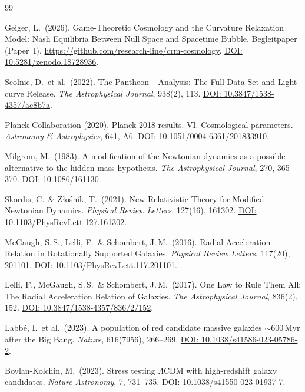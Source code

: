 \documentclass[aps,prd,twocolumn,superscriptaddress,nofootinbib]{revtex4-2}
\begin{document}
\begin{thebibliography}{99}

Geiger, L.\ (2026).
Game-Theoretic Cosmology and the Curvature Relaxation Model: Nash Equilibria Between Null Space and Spacetime Bubble.
Begleitpaper (Paper~I). \url{https://github.com/research-line/crm-cosmology}. \href{https://doi.org/10.5281/zenodo.18728936}{DOI: 10.5281/zenodo.18728936}.

Scolnic, D.\ et al.\ (2022).
The Pantheon+ Analysis: The Full Data Set and Light-curve Release.
\textit{The Astrophysical Journal}, 938(2), 113.
\href{https://doi.org/10.3847/1538-4357/ac8b7a}{DOI: 10.3847/1538-4357/ac8b7a}.

Planck Collaboration (2020).
Planck 2018 results. VI. Cosmological parameters.
\textit{Astronomy \& Astrophysics}, 641, A6.
\href{https://doi.org/10.1051/0004-6361/201833910}{DOI: 10.1051/0004-6361/201833910}.

Milgrom, M.\ (1983).
A modification of the Newtonian dynamics as a possible alternative to the hidden mass hypothesis.
\textit{The Astrophysical Journal}, 270, 365--370.
\href{https://doi.org/10.1086/161130}{DOI: 10.1086/161130}.

Skordis, C.\ \& Z{\l}o\'snik, T.\ (2021).
New Relativistic Theory for Modified Newtonian Dynamics.
\textit{Physical Review Letters}, 127(16), 161302.
\href{https://doi.org/10.1103/PhysRevLett.127.161302}{DOI: 10.1103/PhysRevLett.127.161302}.

McGaugh, S.\,S., Lelli, F.\ \& Schombert, J.\,M.\ (2016).
Radial Acceleration Relation in Rotationally Supported Galaxies.
\textit{Physical Review Letters}, 117(20), 201101.
\href{https://doi.org/10.1103/PhysRevLett.117.201101}{DOI: 10.1103/PhysRevLett.117.201101}.

Lelli, F., McGaugh, S.\,S.\ \& Schombert, J.\,M.\ (2017).
One Law to Rule Them All: The Radial Acceleration Relation of Galaxies.
\textit{The Astrophysical Journal}, 836(2), 152.
\href{https://doi.org/10.3847/1538-4357/836/2/152}{DOI: 10.3847/1538-4357/836/2/152}.

Labb\'e, I.\ et al.\ (2023).
A population of red candidate massive galaxies $\sim$600\,Myr after the Big Bang.
\textit{Nature}, 616(7956), 266--269.
\href{https://doi.org/10.1038/s41586-023-05786-2}{DOI: 10.1038/s41586-023-05786-2}.

Boylan-Kolchin, M.\ (2023).
Stress testing $\Lambda$CDM with high-redshift galaxy candidates.
\textit{Nature Astronomy}, 7, 731--735.
\href{https://doi.org/10.1038/s41550-023-01937-7}{DOI: 10.1038/s41550-023-01937-7}.


\end{thebibliography}
\end{document}
